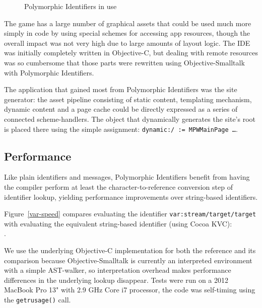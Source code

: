 \documentclass[preprint]{sigplanconf}
\begin{document}
\begin{figure}[htbp]
\centering
\caption{Polymorphic Identifiers in use}
\label{pi-inuse}
\end{figure}


The game has a large number of graphical assets that could be used much more simply in code by using special schemes for accessing app
resources, though the overall impact was not very high due to large amounts of layout logic. 
 The IDE was initially completely written in Objective-C, but dealing with remote resources was so cumbersome that
those parts were rewritten using Objective-Smalltalk with Polymorphic Identifiers.

The application that gained most from Polymorphic Identifiers was the site generator:  the asset pipeline consisting of static
content, templating mechanism, dynamic content and a page cache could be directly expressed as a series of connected
scheme-handlers.  The object that dynamically generates the site's root is placed there using the simple assignment: {\tt dynamic:/  := MPWMainPage \dots}.


\subsection{Performance}

Like plain identifiers and messages, Polymorphic Identifiers benefit from having the compiler perform
at least the character-to-reference conversion step of identifier lookup, yielding performance 
improvements over string-based identifiers.

\sloppy
Figure~\ref{var-speed} compares evaluating the identifier {\tt var:stream/target/target} with evaluating the  
equivalent string-based identifier (using Cocoa KVC): \\  { . }
\fussy

We use the underlying Objective-C implementation for both the reference and its 
comparison because Objective-Smalltalk is currently an interpreted environment with
a simple AST-walker, so interpretation overhead makes performance differences in
the underlying lookup disappear.  Tests were run on a 2012 MacBook Pro 13" with 2.9 GHz Core i7 processor, the
code was self-timing using the {\tt getrusage()} call.  
\end{document}
